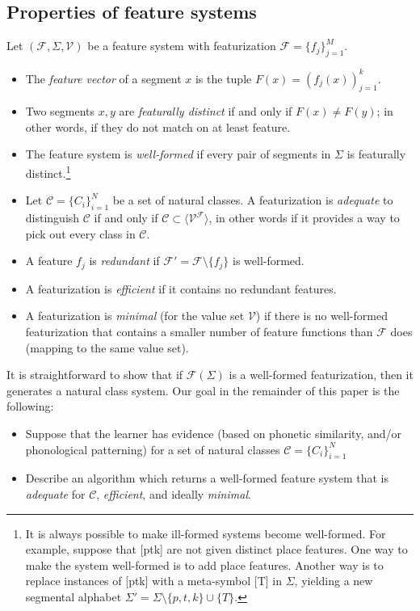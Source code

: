 \documentclass[11pt, oneside]{article}   	%
\begin{document}
\subsection{Properties of feature systems}

\vspace{\baselineskip} \noindent Let $(\mathcal F, \Sigma, \mathcal V)$ be a feature system with featurization $\mathcal F = \{f_j\}_{j=1}^M$. \begin{itemize}
    \item The \textit{feature vector} of a segment $x$ is the tuple $F(x) = (f_j(x))_{j=1}^k$.
    \item Two segments $x, y$ are \textit{featurally distinct} if and only if $F(x) \neq F(y)$; in other words, if they do not match on at least feature.
    \item The feature system is \textit{well-formed} if every pair of segments in $\Sigma$ is featurally distinct.\footnote{It is always possible to make ill-formed systems become well-formed. For example, suppose that [ptk] are not given distinct place features. One way to make the system well-formed is to add place features. Another way is to replace instances of [ptk] with a meta-symbol [T] in $\Sigma$, yielding a new segmental alphabet $\Sigma ' = \Sigma \setminus \{p,t,k\} \cup \{T\}$.}
    \item Let $\mathcal C = \{C_i\}_{i=1}^N$ be a set of natural classes. A featurization is \textit{adequate} to distinguish $\mathcal C$ if and only if $\mathcal C \subset \langle \mathcal V^\mathcal F \rangle$, in other words if it provides a way to pick out every class in $\mathcal C$.
    \item A feature $f_j$ is \textit{redundant} if $\mathcal F' = \mathcal F \setminus \{ f_j \}$ is well-formed.
    \item A featurization is \textit{efficient} if it contains no redundant features.
    \item A featurization is \textit{minimal} (for the value set $\mathcal V$) if there is no well-formed featurization that contains a smaller number of feature functions than $\mathcal F$ does (mapping to the same value set).
    \end{itemize}
    
\vspace{\baselineskip} \noindent It is straightforward to show that if $\mathcal F(\Sigma)$ is a well-formed featurization, then it generates a natural class system. Our goal in the remainder of this paper is the following: \begin{itemize}
    \item Suppose that the learner has evidence (based on phonetic similarity, and/or phonological patterning) for a set of natural classes $\mathcal C = \{C_i\}_{i=1}^N$
    \item Describe an algorithm which returns a well-formed feature system that is \textit{adequate} for $\mathcal C$, \textit{efficient}, and ideally \textit{minimal}.
    \end{itemize}
\end{document}
